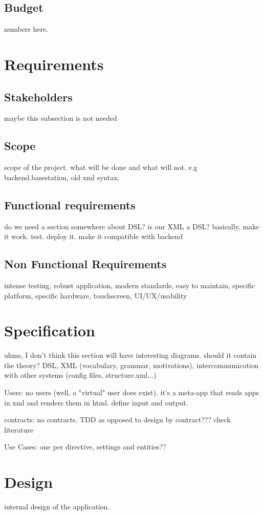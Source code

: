 \section{Budget}
numbers here.

\chapter{Requirements}
\section{Stakeholders}
maybe this subsection is not needed
\section{Scope}
scope of the project. what will be done and what will not. e.g backend.basestation, old xml syntax.
\section{Functional requirements}
do we need a section somewhere about DSL? is our XML a DSL?
basically, make it work. test. deploy it. make it compatible with backend

\section{Non Functional Requirements}
intense testing, robust application, modern standards, easy to maintain, specific platform, specific hardware, touchscreen, UI/UX/usability 

\chapter{Specification}
uhms, I don't think this section will have interesting diagrams.
should it contain the theory? DSL, XML (vocabulary, grammar, motivations), intercommunication with other systems (config files, structure.xml...)

Users: no users (well, a "virtual" user does exist). it's a meta-app that reads apps in xml and renders them in html. define input and output.

contracts: no contracts. TDD as opposed to design by contract??? check literature

Use Cases: one per directive, settings and entities??

\chapter{Design}
internal design of the application.
